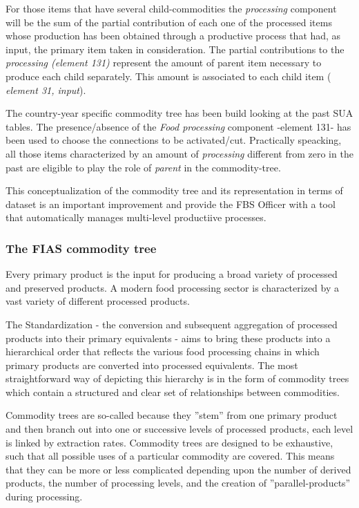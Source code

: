\documentclass[nojss]{jss}
\begin{document}
For those items that have several child-commodities the \textit{processing} component will be the sum of the partial contribution of each one of the processed items whose production has been obtained through a productive process that had, as input, the primary item taken in consideration. The partial contributions to the \textit{processing (element 131)} represent the amount of parent item necessary to produce each child separately. This amount is associated to each child item ( \textit{element 31, input}).


The country-year specific commodity tree has been build looking at the past SUA tables. The presence/absence of the \textit{Food processing} component -element 131- has been used to choose the connections to be  activated/cut.
Practically speacking, all those items characterized by an amount of  \textit{processing} different from zero in the past are eligible to play the role of \textit{parent} in the commodity-tree.

This conceptualization of the commodity tree and its representation in terms of dataset is an important improvement and provide the FBS Officer with a tool that automatically manages multi-level productiive processes. 




\subsubsection{The FIAS commodity tree}

Every primary product is the input for producing a broad variety of processed and preserved products. A modern food processing sector is characterized by a vast variety of different processed products.

The Standardization - the conversion and subsequent aggregation of processed products into their primary equivalents - aims to bring these products into a hierarchical order that reflects the various food processing chains in which primary products are converted into processed equivalents. The most straightforward way of depicting this hierarchy is in the form of commodity trees which contain a structured and clear set of relationships between commodities. 

Commodity trees are so-called because they ''stem'' from one primary product and then branch out into one or successive levels of processed products, each level is linked by extraction rates. Commodity trees are designed to be exhaustive, such that all possible uses of a particular commodity are covered. This means that they can be more or less complicated depending upon the number of derived products, the number of processing levels, and the creation of ''parallel-products'' during processing. 
\end{document}
